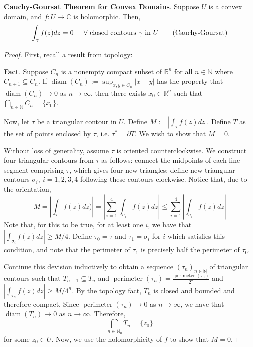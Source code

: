 \begin{framed}
    \textbf{Cauchy-Goursat Theorem for Convex Domains}. Suppose $U$ is a convex domain, and $f:U\to\mathbb{C}$ is holomorphic. Then, \[\int_\gamma f(z)dz = 0\hspace{0.2in}\forall \text{ closed contours }\gamma \text{ in }U\tag{Cauchy-Goursat}\] \begin{proof}
        First, recall a result from topology:

        \textbf{Fact}. Suppose $C_n$ is a nonempty compact subset of $\mathbb{R}^n$ for all $n\in\mathbb{N}$ where $C_{n+1}\subseteq C_n$. If $\operatorname{diam}(C_n) := \displaystyle\sup_{x,y\in C_n} |x-y|$ has the property that $\operatorname{diam}(C_n)\to 0$ as $n\to\infty$, then there exists $x_0\in\mathbb{R}^n$ such that $\displaystyle\bigcap_{n\in\mathbb{N}} C_n = \{x_0\}$.

        Now, let $\tau$ be a triangular contour in $U$. Define $M:=\left|\int_\tau f(z)dz\right|$. Define $T$ as the set of points enclosed by $\tau$, i.e. $\tau^*=\partial T$. We wish to show that $M=0$.

        Without loss of generality, assume $\tau$ is oriented counterclockwise. We construct four triangular contours from $\tau$ as follows: connect the midpoints of each line segment comprising $\tau$, which gives four new triangles; define new triangular contours $\sigma_i,\ i=1,2,3,4$ following these contours clockwise. Notice that, due to the orientation, \[M=\left|\int_\tau f(z)dz)\right| = \left|\sum_{i=1}^4 \int_{\sigma_i} f(z)dz\right| \leq \sum_{i=1}^4 \left|\int_{\sigma_i} f(z)dz\right|\] Note that, for this to be true, for at least one $i$, we have that $\left|\int_{\sigma_i} f(z)dz\right|\geq M/4$. Define $\tau_0 = \tau$ and $\tau_1 = \sigma_i$ for $i$ which satisfies this condition, and note that the perimeter of $\tau_1$ is precisely half the perimeter of $\tau_0$.

        Continue this devision inductively to obtain a sequence $(\tau_n)_{n\in\mathbb{N}}$ of triangular contours such that $T_{n+1}\subseteq T_n$ and $\operatorname{perimeter}(\tau_n) = \frac{\operatorname{perimeter}(\tau_0)}{2^n}$ and $\left|\int_{\tau_n} f(z)dz\right| \geq M/4^n$. By the topology fact, $T_n$ is closed and bounded and therefore compact. Since $\operatorname{perimeter}(\tau_n)\to 0$ as $n\to\infty$, we have that $\operatorname{diam}(T_n)\to 0$ as $n\to\infty$. Therefore, \[\bigcap_{n\in\mathbb{N}_0} T_n = \{z_0\}\] for some $z_0\in U$. Now, we use the holomorphicity of $f$ to show that $M=0$.


\end{proof}
\end{framed}
